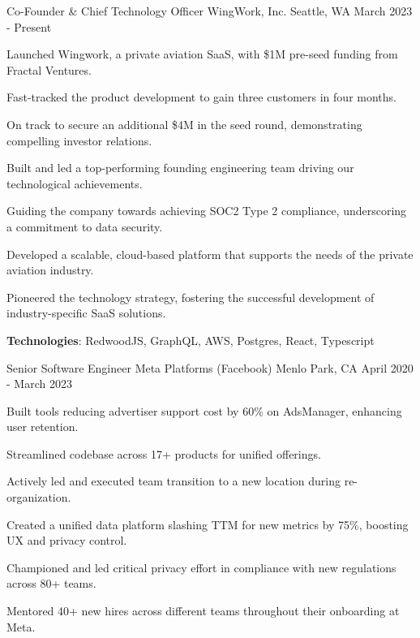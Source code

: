 \begin{cventries}
  \cventry
    {Co-Founder \& Chief Technology Officer}
    {WingWork, Inc.}
    {Seattle, WA}
    {March 2023 - Present}
    {
      \begin{cvitems}
        \item {Launched Wingwork, a private aviation SaaS, with \$1M pre-seed funding from Fractal Ventures.}
        \item {Fast-tracked the product development to gain three customers in four months.}
        \item {On track to secure an additional \$4M in the seed round, demonstrating compelling investor relations.}
        \item {Built and led a top-performing founding engineering team driving our technological achievements.}
        \item {Guiding the company towards achieving SOC2 Type 2 compliance, underscoring a commitment to data security.}
        \item {Developed a scalable, cloud-based platform that supports the needs of the private aviation industry.}
        \item {Pioneered the technology strategy, fostering the successful development of industry-specific SaaS solutions.}
        \item {\textbf{Technologies}: RedwoodJS, GraphQL, AWS, Postgres, React, Typescript}
      \end{cvitems}
    }
    {}
    {}
  \cventry
    {Senior Software Engineer}
    {Meta Platforms (Facebook)}
    {Menlo Park, CA}
    {April 2020 - March 2023}
    {
      \begin{cvitems}
        \item {Built tools reducing advertiser support cost by 60\% on AdsManager, enhancing user retention.}
        \item {Streamlined codebase across 17+ products for unified offerings.}
        \item {Actively led and executed team transition to a new location during re-organization.}
        \item {Created a unified data platform slashing TTM for new metrics by 75\%, boosting UX and privacy control.}
        \item {Championed and led critical privacy effort in compliance with new regulations across 80+ teams.}
        \item {Mentored 40+ new hires across different teams throughout their onboarding at Meta.}

\end{cvitems}}
\end{cventries}
